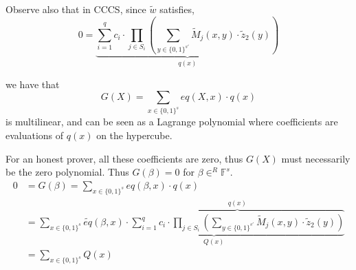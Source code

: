 \documentclass{article}
\theoremstyle{definition}
\begin{document}
Observe also that in CCCS, since $\widetilde{w}$ satisfies,
$$
0=\underbrace{\sum_{i=1}^q c_i \cdot \prod_{j \in S_i} \left( \sum_{y \in \{0, 1\}^{s'}} \widetilde{M}_j(x, y) \cdot \widetilde{z}_2(y) \right)}_{q(x)}
$$

we have that
$$
G(X) = \sum_{x \in \{0,1\}^s} eq(X, x) \cdot q(x)
$$
is multilinear, and can be seen as a Lagrange polynomial where coefficients are evaluations of $q(x)$ on the hypercube.

For an honest prover, all these coefficients are zero, thus $G(X)$ must necessarily be the zero polynomial. Thus $G(\beta)=0$ for $\beta \in^R \mathbb{F}^s$.
\begin{align*}
	0&=G(\beta) = \sum_{x \in \{0,1\}^s} eq(\beta, x) \cdot q(x)\\
	 &= \sum_{x \in \{0,1\}^s}
	 \underbrace{\widetilde{eq}(\beta , x) \cdot
		 \overbrace{
			\sum_{i=1}^q c_i \cdot \prod_{j \in S_i} \left( \sum_{y \in \{0, 1\}^{s'}} \widetilde{M}_j(x, y) \cdot \widetilde{z}_2(y) \right)
		}^{q(x)}
	}_{Q(x)}\\
	 &= \sum_{x \in \{0,1\}^s} Q(x)
\end{align*}
\end{document}
